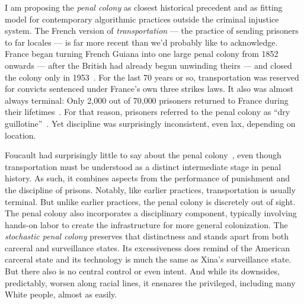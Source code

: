 I am proposing the \emph{penal colony} as closest historical precedent and as
fitting model for contemporary algorithmic practices outside the criminal
injustice system. The French version of \emph{transportation} --- the practice
of sending prisoners to far locales --- is far more recent than we'd probably
like to acknowledge. France began turning French Guiana into one large penal
colony from 1852 onwards --- after the British had already begun unwinding
theirs --- and closed the colony only in
1953~\cite{Aldrich2010,Anderson2018,Spierenburg2009}. For the last 70 years or
so, transportation was reserved for convicts sentenced under France's own three
strikes laws. It also was almost always terminal: Only 2,000 out of 70,000
prisoners returned to France during their
lifetimes~\cite{WallechinskyWallace1978}. For that reason, prisoners referred to
the penal colony as ``dry guillotine''~\cite{Furlong1913,ReneBelbenoit1938}. Yet
discipline was surprisingly inconsistent, even lax, depending on location.

Foucault had surprisingly little to say about the penal
colony~\cite{Redfield2005}, even though transportation must be understood as a
distinct intermediate stage in penal history. As such, it combines aspects from
the performance of punishment and the discipline of prisons. Notably, like
earlier practices, transportation is usually terminal. But unlike earlier
practices, the penal colony is discretely out of sight. The penal colony also
incorporates a disciplinary component, typically involving hands-on labor to
create the infrastructure for more general colonization. The \emph{stochastic
penal colony} preserves that distinctness and stands apart from both carceral
and surveillance states. Its excessiveness does remind of the American carceral
state and its technology is much the same as Xina's surveillance state. But
there also is no central control or even intent. And while its downsides,
predictably, worsen along racial lines, it ensnares the privileged, including
many White people, almost as easily.

